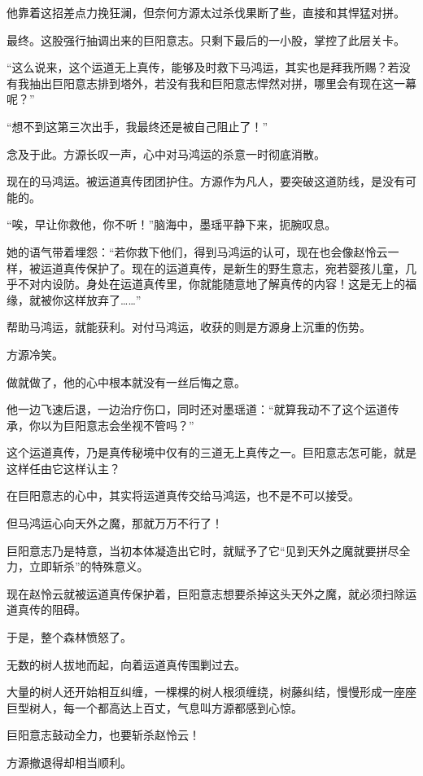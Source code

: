 \begin{this_body}
他靠着这招差点力挽狂澜，但奈何方源太过杀伐果断了些，直接和其悍猛对拼。

最终。这股强行抽调出来的巨阳意志。只剩下最后的一小股，掌控了此层关卡。

“这么说来，这个运道无上真传，能够及时救下马鸿运，其实也是拜我所赐？若没有我抽出巨阳意志排到塔外，若没有我和巨阳意志悍然对拼，哪里会有现在这一幕呢？”

“想不到这第三次出手，我最终还是被自己阻止了！”

念及于此。方源长叹一声，心中对马鸿运的杀意一时彻底消散。

现在的马鸿运。被运道真传团团护住。方源作为凡人，要突破这道防线，是没有可能的。

“唉，早让你救他，你不听！”脑海中，墨瑶平静下来，扼腕叹息。

她的语气带着埋怨：“若你救下他们，得到马鸿运的认可，现在也会像赵怜云一样，被运道真传保护了。现在的运道真传，是新生的野生意志，宛若婴孩儿童，几乎不对内设防。身处在运道真传里，你就能随意地了解真传的内容！这是无上的福缘，就被你这样放弃了……”

帮助马鸿运，就能获利。对付马鸿运，收获的则是方源身上沉重的伤势。

方源冷笑。

做就做了，他的心中根本就没有一丝后悔之意。

他一边飞速后退，一边治疗伤口，同时还对墨瑶道：“就算我动不了这个运道传承，你以为巨阳意志会坐视不管吗？”

这个运道真传，乃是真传秘境中仅有的三道无上真传之一。巨阳意志怎可能，就是这样任由它这样认主？

在巨阳意志的心中，其实将运道真传交给马鸿运，也不是不可以接受。

但马鸿运心向天外之魔，那就万万不行了！

巨阳意志乃是特意，当初本体凝造出它时，就赋予了它“见到天外之魔就要拼尽全力，立即斩杀”的特殊意义。

现在赵怜云就被运道真传保护着，巨阳意志想要杀掉这头天外之魔，就必须扫除运道真传的阻碍。

于是，整个森林愤怒了。

无数的树人拔地而起，向着运道真传围剿过去。

大量的树人还开始相互纠缠，一棵棵的树人根须缠绕，树藤纠结，慢慢形成一座座巨型树人，每一个都高达上百丈，气息叫方源都感到心惊。

巨阳意志鼓动全力，也要斩杀赵怜云！

方源撤退得却相当顺利。


\end{this_body}
